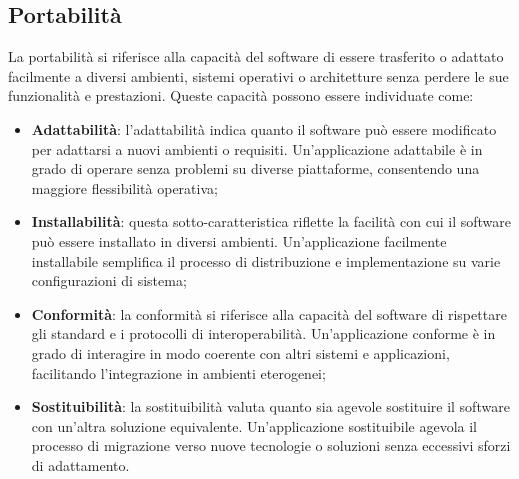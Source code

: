 \subsection{Portabilità}
La portabilità si riferisce alla capacità del software di essere trasferito o adattato facilmente 
a diversi ambienti, sistemi operativi o architetture senza perdere le sue funzionalità e
prestazioni. Queste capacità possono essere individuate come:
\begin{itemize}
    \item \textbf{Adattabilità}: l’adattabilità indica quanto il software può essere modificato per adattarsi 
    a nuovi ambienti o requisiti. Un’applicazione adattabile è in grado di operare senza
    problemi su diverse piattaforme, consentendo una maggiore flessibilità operativa;
    \item \textbf{Installabilità}: questa sotto-caratteristica riflette la facilità con cui il software può
    essere installato in diversi ambienti. Un’applicazione facilmente installabile semplifica
    il processo di distribuzione e implementazione su varie configurazioni di sistema;
    \item \textbf{Conformità}: la conformità si riferisce alla capacità del software di rispettare gli
    standard e i protocolli di interoperabilità. Un’applicazione conforme è in grado di
    interagire in modo coerente con altri sistemi e applicazioni, facilitando l’integrazione
    in ambienti eterogenei;
    \item \textbf{Sostituibilità}: la sostituibilità valuta quanto sia agevole sostituire il software con
    un’altra soluzione equivalente. Un’applicazione sostituibile agevola il processo di migrazione verso 
    nuove tecnologie o soluzioni senza eccessivi sforzi di adattamento.
\end{itemize}